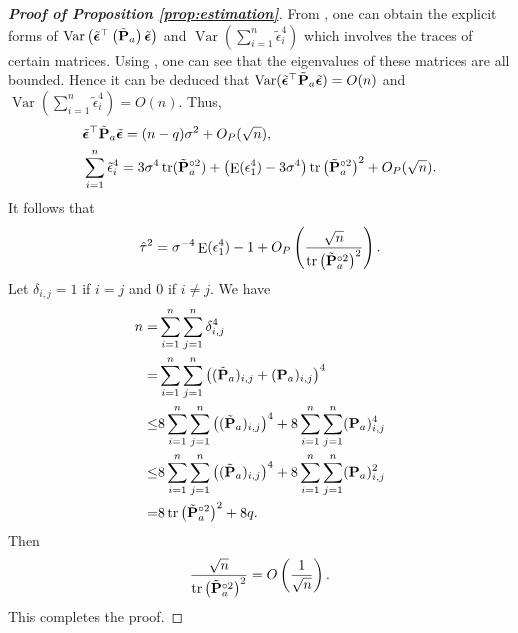 \documentclass[bj]{imsart}
\DeclareMathOperator{\mytr}{tr}
\DeclareMathOperator{\myE}{E}
\DeclareMathOperator{\myVar}{Var}
\theoremstyle{plain}
\theoremstyle{definition}
\theoremstyle{remark}
\begin{document}
\begin{proof}[\textbf{Proof of Proposition \ref{prop:estimation}}]
    From \cite[Theorem 2.1]{Bai2017}, one can obtain the explicit forms of $\myVar \left( \tilde \bepsilon^\top \left( \tilde \BP_a \right) \tilde \bepsilon  \right)$ and $\myVar \left( \sum_{i=1}^n \tilde \epsilon_i^4 \right)$ which involves the traces of certain matrices.
    Using \cite[Theorem 5.5.1]{book:1244195}, one can see that the eigenvalues of these matrices are all bounded.
    Hence it can be deduced that $\myVar ( \tilde \bepsilon^\top  \tilde \BP_a \tilde \bepsilon  )=O(n)$ and $\myVar \left( \sum_{i=1}^n \tilde \epsilon_i^4 \right)=O(n)$.
    Thus,
    \begin{align*}
        & \tilde \bepsilon^\top  \tilde \BP_a  \tilde \bepsilon
        = (n-q) \sigma^2+O_P(\sqrt n),
        \\
        & \sum_{i=1}^n \tilde \epsilon_i^4 
        =
        3\sigma^4 \mytr (\tilde \BP_a^{\circ 2}) 
        +\left( \myE (\epsilon_1^4)-3 \sigma^{4}\right)
        \mytr \left( \tilde \BP_a^{\circ 2}  \right)^2 + O_P(\sqrt n).
    \end{align*}
    It follows that
    \begin{equation*}
        \hat \tau ^2 = \sigma^{-4}\myE (\epsilon_1^4)-1
        +O_P\left( \frac{\sqrt n}{\mytr \left( \tilde \BP_a ^{\circ 2} \right)^2} \right).
    \end{equation*}
    Let $\delta_{i,j}=1$ if $i=j$ and $0$ if $i\neq j$.
    We have
    \begin{equation*}
        \begin{split}
        n=&
        \sum_{i=1}^n \sum_{j=1}^n \delta_{i,j}^4 
        \\
        =&
        \sum_{i=1}^n \sum_{j=1}^n \left( (\tilde \BP_{a})_{i,j}+(\BP_{a})_{i,j} \right)^4 
        \\
        \leq&
    8\sum_{i=1}^n \sum_{j=1}^n \left( (\tilde \BP_{a})_{i,j}\right)^4+
    8\sum_{i=1}^n \sum_{j=1}^n(\BP_{a})_{i,j}^4
        \\
        \leq&
    8\sum_{i=1}^n \sum_{j=1}^n \left( (\tilde \BP_{a})_{i,j}\right)^4+
    8\sum_{i=1}^n \sum_{j=1}^n(\BP_{a})_{i,j}^2
    \\
    =&
        8\mytr \left(   \tilde \BP_a^{\circ 2} \right)^2
        +8q.
        \end{split}
    \end{equation*}
    Then
    \begin{equation*}
        \frac{\sqrt n}{\mytr \left( \tilde \BP_a^{\circ 2} \right)^2} 
        =
        O\left( \frac{1}{\sqrt n} \right).
    \end{equation*}
    This completes the proof.
\end{proof}
\end{document}
